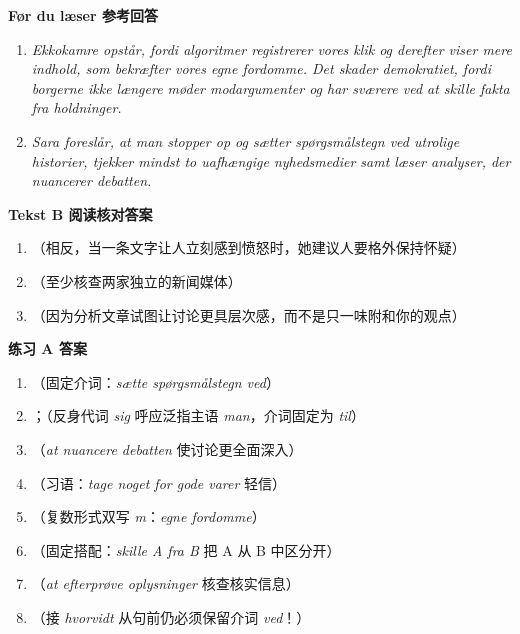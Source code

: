 \begin{answerbox}
\textbf{Før du læser 参考回答}
\begin{enumerate}
  \item \textit{Ekkokamre opstår, fordi algoritmer registrerer vores klik og derefter viser mere indhold, som bekræfter vores egne fordomme. Det skader demokratiet, fordi borgerne ikke længere møder modargumenter og har sværere ved at skille fakta fra holdninger.}
  \item \textit{Sara foreslår, at man stopper op og sætter spørgsmålstegn ved utrolige historier, tjekker mindst to uafhængige nyhedsmedier samt læser analyser, der nuancerer debatten.}
\end{enumerate}

\textbf{Tekst B 阅读核对答案}
\begin{enumerate}
  \item {}（相反，当一条文字让人立刻感到愤怒时，她建议人要格外保持怀疑）
  \item {}（至少核查两家独立的新闻媒体）
  \item {}（因为分析文章试图让讨论更具层次感，而不是只一味附和你的观点）
\end{enumerate}

\textbf{练习 A 答案}
\begin{enumerate}
  \item {}（固定介词：\textit{sætte spørgsmålstegn ved}）
  \item {}；（反身代词 \textit{sig} 呼应泛指主语 \textit{man}，介词固定为 \textit{til}）
  \item {}（\textit{at nuancere debatten} 使讨论更全面深入）
  \item {}（习语：\textit{tage noget for gode varer} 轻信）
  \item {}（复数形式双写 \textit{m}：\textit{egne fordomme}）
  \item {}（固定搭配：\textit{skille A fra B} 把 A 从 B 中区分开）
  \item {}（\textit{at efterprøve oplysninger} 核查核实信息）
  \item {}（接 \textit{hvorvidt} 从句前仍必须保留介词 \textit{ved}！）
\end{enumerate}


\end{answerbox}
